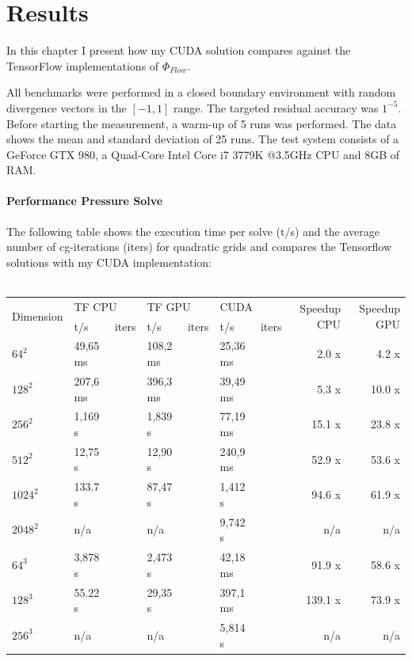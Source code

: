 \chapter{Results}\label{chapter:results}

In this chapter I present how my CUDA solution compares against the TensorFlow implementations of $\Phi_{Flow}$.
\par All benchmarks were performed in a closed boundary environment with random divergence vectors in the $\left[-1, 1 \right]$ range. The targeted residual accuracy was $1^{-5}$. Before starting the measurement, a warm-up of 5 runs was performed. The data shows the mean and standard deviation of 25 runs. The test system consists of a GeForce GTX 980, a Quad-Core Intel Core i7 3779K @3.5GHz CPU and 8GB of RAM.
\subsubsection{Performance Pressure Solve}
The following table shows the execution time per solve (t/s) and the average number of cg-iterations (iters) for quadratic grids and compares the Tensorflow solutions with my CUDA implementation: \\\\
\renewcommand{\arraystretch}{1.39}
\footnotesize{
\begin{tabular}{l||l|l|l|l|l|l||r|r}
\hline
\multirow{2}{*}{Dimension} & \multicolumn{2}{l|}{TF CPU} & \multicolumn{2}{l|}{TF GPU} & \multicolumn{2}{l||}{CUDA} & \multirow{2}{*}{Speedup CPU} & \multirow{2}{*}{Speedup GPU} \\ \cline{2-7} 
                  & t/s        & iters        & t/s        & iters        & t/s         & iters        &             &             \\ \hline
$64^2$   & 49,65 ms &  & 108,2 ms &  & 25,36 ms &  & 2.0 x   & 4.2 x  \\ \hline
$128^2$  & 207,6 ms &  & 396,3 ms &  & 39,49 ms &  & 5.3 x   & 10.0 x \\ \hline
$256^2$  & 1,169 s  &   & 1,839 s &  & 77,19 ms &  & 15.1 x  & 23.8 x \\ \hline
$512^2$  & 12,75 s  &   & 12,90 s &  & 240,9 ms &  & 52.9 x  & 53.6 x \\ \hline
$1024^2$ & 133.7 s  &   & 87,47 s &  & 1,412 s  &  & 94.6 x  & 61.9 x \\ \hline
$2048^2$ & n/a      &   & n/a     &  & 9,742 s  &  & n/a     & n/a    \\ \hline \hline

$64^3$   & 3,878 s  &  & 2,473 s  &  & 42,18 ms &  & 91.9 x  & 58.6 x \\ \hline
$128^3$  & 55.22 s  &  & 29,35 s  &  & 397,1 ms &  & 139.1 x & 73.9 x \\ \hline
$256^3$  & n/a      &  & n/a      &  & 5,814 s  &  & n/a  & n/a 		  \\ \hline
\end{tabular}
}

